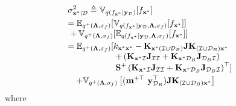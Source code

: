 \documentclass[conference]{IEEEtran}
\begin{document}
	\begin{equation*}
		\hspace{-5.7mm}
		\begin{array}{l}
			\displaystyle\sigma^2_{\mathbf{x}^*|\mathcal{D}}
			\displaystyle\triangleq\mathbb{V}_{q(f_{\mathbf{x}^*}|\mathbf{y}_\mathcal{D})}[f_{\mathbf{x}^*}] \vspace{1mm}\\
			\displaystyle=\mathbb{E}_{q^+(\mathbf{\Lambda},\sigma_f)}[\mathbb{V}_{q(f_{\mathbf{x}^*}|\mathbf{y}_\mathcal{D},\mathbf{\Lambda},\sigma_f)}[f_{\mathbf{x}^*}]] \\
			\ +\hspace{0.5mm} \mathbb{V}_{q^+(\mathbf{\Lambda},\sigma_f)}[\mathbb{E}_{q(f_{\mathbf{x}^*}|\mathbf{y}_\mathcal{D},\mathbf{\Lambda},\sigma_f)}[f_{\mathbf{x}^*}]]\vspace{1mm}\\
			\displaystyle=\mathbb{E}_{q^+(\mathbf{\Lambda},\sigma_f)}[k_{\mathbf{x}^*\mathbf{x}^*}-
			\mathbf{K}_{\mathbf{x}^*(\mathcal{I}\cup\mathcal{D}_B)} 
			\mathbf{J}
			\mathbf{K}_{(\mathcal{I}\cup\mathcal{D}_B)\mathbf{x}^*}\\
			\displaystyle\qquad\qquad\quad\ \  + \left(\mathbf{K}_{\mathbf{x}^*\mathcal{I}}\mathbf{J}_{\mathcal{I}\mathcal{I}}+\mathbf{K}_{\mathbf{x}^*\mathcal{D}_B}\mathbf{J}_{\mathcal{D}_B\mathcal{I}}\right)\\
			\displaystyle\qquad\qquad\quad\ \ \mathbf{S}^+\left(\mathbf{K}_{\mathbf{x}^*\mathcal{I}}\mathbf{J}_{\mathcal{I}\mathcal{I}}+\mathbf{K}_{\mathbf{x}^*\mathcal{D}_B}\mathbf{J}_{\mathcal{D}_B\mathcal{I}}\right)^{\top}]\vspace{1mm}\\
			\displaystyle\quad+\mathbb{V}_{q^+(\mathbf{\Lambda},\sigma_f)}\left[
			(\mathbf{m}^{+\top}\ \mathbf{y}^{\top}_{\mathcal{D}_B})
			\mathbf{J}
			\mathbf{K}_{(\mathcal{I}\cup\mathcal{D}_B)\mathbf{x}^*} \right]
		\end{array}
	\end{equation*}
	where
\end{document}
